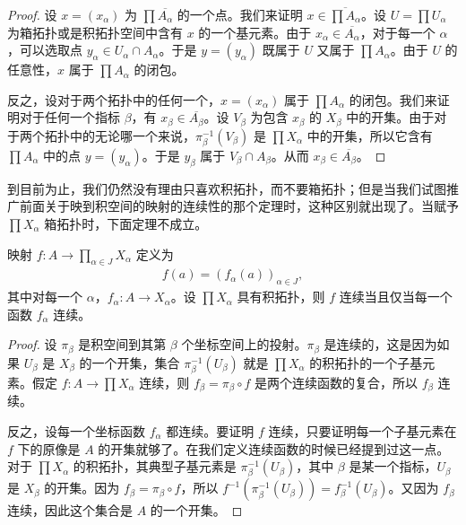 \documentclass[../../main.tex]{subfiles}
\begin{document}
\begin{proof}
设 $x = (x_{\alpha})$ 为 $\prod \overline{A_{\alpha}}$ 的一个点。我们来证明 $x \in \overline{\prod A_{\alpha}}$。设 $U = \prod U_{\alpha}$ 为箱拓扑或是积拓扑空间中含有 $x$ 的一个基元素。由于 $x_{\alpha} \in \overline{A_{\alpha}}$，对于每一个 $\alpha$，可以选取点 $y_{\alpha} \in U_{\alpha} \cap A_{\alpha}$。于是 $y = (y_{\alpha})$ 既属于 $U$ 又属于 $\prod A_{\alpha}$。由于 $U$ 的任意性，$x$ 属于 $\prod A_{\alpha}$ 的闭包。

反之，设对于两个拓扑中的任何一个，$x = (x_{\alpha})$ 属于 $\prod A_{\alpha}$ 的闭包。我们来证明对于任何一个指标 $\beta$，有 $x_{\beta} \in \overline{A_{\beta}}$。设 $V_{\beta}$ 为包含 $x_{\beta}$ 的 $X_{\beta}$ 中的开集。由于对于两个拓扑中的无论哪一个来说，$\pi_{\beta}^{-1}(V_{\beta})$ 是 $\prod X_{\alpha}$ 中的开集，所以它含有 $\prod A_{\alpha}$ 中的点 $y = (y_{\alpha})$。于是 $y_{\beta}$ 属于 $V_{\beta} \cap A_{\beta}$。从而 $x_{\beta} \in \overline{A_{\beta}}$。
\end{proof}

到目前为止，我们仍然没有理由只喜欢积拓扑，而不要箱拓扑；但是当我们试图推广前面关于映到积空间的映射的连续性的那个定理时，这种区别就出现了。当赋予 $\prod X_{\alpha}$ 箱拓扑时，下面定理不成立。

\begin{theorem}\label{theorem:ch02-到积空间映射}
映射 $f: A \rightarrow \prod_{\alpha \in J} X_{\alpha}$ 定义为
\begin{align*}
f(a) = (f_{\alpha}(a))_{\alpha \in J},
\end{align*}
其中对每一个 $\alpha$，$f_{\alpha}: A \rightarrow X_{\alpha}$。设 $\prod X_{\alpha}$ 具有积拓扑，则 $f$ 连续当且仅当每一个函数 $f_{\alpha}$ 连续。
\end{theorem}

\begin{proof}
设 $\pi_{\beta}$ 是积空间到其第 $\beta$ 个坐标空间上的投射。$\pi_{\beta}$ 是连续的，这是因为如果 $U_{\beta}$ 是 $X_{\beta}$ 的一个开集，集合 $\pi_{\beta}^{-1}(U_{\beta})$ 就是 $\prod X_{\alpha}$ 的积拓扑的一个子基元素。假定 $f: A \rightarrow \prod X_{\alpha}$ 连续，则 $f_{\beta} = \pi_{\beta} \circ f$ 是两个连续函数的复合，所以 $f_{\beta}$ 连续。

反之，设每一个坐标函数 $f_{\alpha}$ 都连续。要证明 $f$ 连续，只要证明每一个子基元素在 $f$ 下的原像是 $A$ 的开集就够了。在我们定义连续函数的时候已经提到过这一点。对于 $\prod X_{\alpha}$ 的积拓扑，其典型子基元素是 $\pi_{\beta}^{-1}(U_{\beta})$，其中 $\beta$ 是某一个指标，$U_{\beta}$ 是 $X_{\beta}$ 的开集。因为 $f_{\beta} = \pi_{\beta} \circ f$，所以 $f^{-1}(\pi_{\beta}^{-1}(U_{\beta})) = f_{\beta}^{-1}(U_{\beta})$。又因为 $f_{\beta}$ 连续，因此这个集合是 $A$ 的一个开集。
\end{proof}
\end{document}
